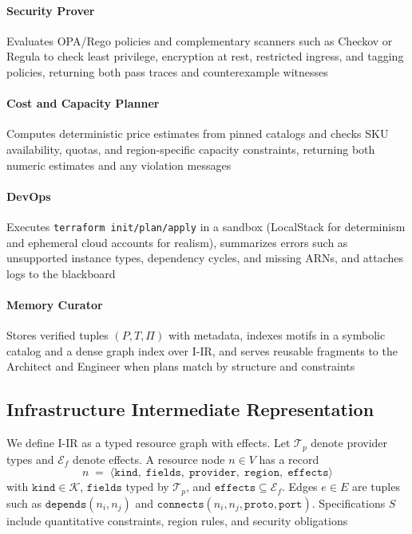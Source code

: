 \documentclass[manuscript,screen,nonacm]{acmart}
\begin{document}
\paragraph{Security Prover}
Evaluates OPA/Rego policies and complementary scanners such as Checkov or Regula to check least privilege, encryption at rest, restricted ingress, and tagging policies, returning both pass traces and counterexample witnesses

\paragraph{Cost and Capacity Planner}
Computes deterministic price estimates from pinned catalogs and checks SKU availability, quotas, and region-specific capacity constraints, returning both numeric estimates and any violation messages

\paragraph{DevOps}
Executes \texttt{terraform init/plan/apply} in a sandbox (LocalStack for determinism and ephemeral cloud accounts for realism), summarizes errors such as unsupported instance types, dependency cycles, and missing ARNs, and attaches logs to the blackboard

\paragraph{Memory Curator}
Stores verified tuples $(P,T,\Pi)$ with metadata, indexes motifs in a symbolic catalog and a dense graph index over I-IR, and serves reusable fragments to the Architect and Engineer when plans match by structure and constraints

\subsection{Infrastructure Intermediate Representation}
\label{sec:iir}

We define I-IR as a typed resource graph with effects. Let $\mathcal{T}_p$ denote provider types and $\mathcal{E}_f$ denote effects. A resource node $n\in V$ has a record
\begin{equation}
n \;=\; \big\langle \texttt{kind},\; \texttt{fields},\; \texttt{provider},\; \texttt{region},\; \texttt{effects} \big\rangle
\end{equation}
with $\texttt{kind} \in \mathcal{K}$, $\texttt{fields}$ typed by $\mathcal{T}_p$, and $\texttt{effects} \subseteq \mathcal{E}_f$. Edges $e\in E$ are tuples such as $\mathtt{depends}(n_i,n_j)$ and $\mathtt{connects}(n_i,n_j,\texttt{proto},\texttt{port})$. Specifications $S$ include quantitative constraints, region rules, and security obligations
\end{document}
